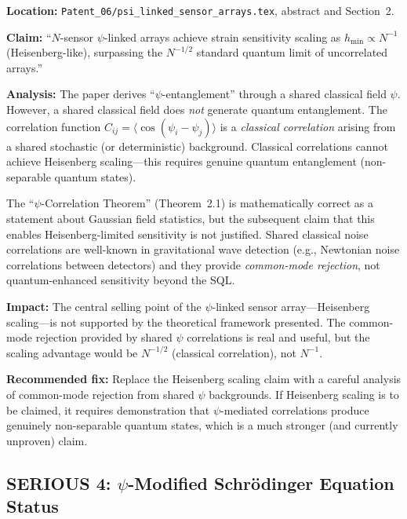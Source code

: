 \documentclass[12pt,a4paper]{article}
\begin{document}
\begin{serious}
\textbf{Location:} \texttt{Patent\_06/psi\_linked\_sensor\_arrays.tex},
abstract and Section~2.

\medskip
\textbf{Claim:} ``$N$-sensor $\psi$-linked arrays achieve strain sensitivity
scaling as $h_{\min} \propto N^{-1}$ (Heisenberg-like), surpassing the
$N^{-1/2}$ standard quantum limit of uncorrelated arrays.''

\medskip
\textbf{Analysis:} The paper derives ``$\psi$-entanglement'' through a
shared classical field $\psi$. However, a shared classical field does
\textit{not} generate quantum entanglement. The correlation function
$C_{ij} = \langle\cos(\psi_i - \psi_j)\rangle$ is a \textit{classical
correlation} arising from a shared stochastic (or deterministic) background.
Classical correlations cannot achieve Heisenberg scaling---this requires
genuine quantum entanglement (non-separable quantum states).

The ``$\psi$-Correlation Theorem'' (Theorem~2.1) is mathematically
correct as a statement about Gaussian field statistics, but the subsequent
claim that this enables Heisenberg-limited sensitivity is not justified.
Shared classical noise correlations are well-known in gravitational wave
detection (e.g., Newtonian noise correlations between detectors) and they
provide \textit{common-mode rejection}, not quantum-enhanced sensitivity
beyond the SQL.

\medskip
\textbf{Impact:} The central selling point of the $\psi$-linked sensor
array---Heisenberg scaling---is not supported by the theoretical framework
presented. The common-mode rejection provided by shared $\psi$ correlations
is real and useful, but the scaling advantage would be $N^{-1/2}$
(classical correlation), not $N^{-1}$.

\medskip
\textbf{Recommended fix:} Replace the Heisenberg scaling claim with a
careful analysis of common-mode rejection from shared $\psi$ backgrounds.
If Heisenberg scaling is to be claimed, it requires demonstration that
$\psi$-mediated correlations produce genuinely non-separable quantum states,
which is a much stronger (and currently unproven) claim.
\end{serious}

\subsection{SERIOUS 4: $\psi$-Modified Schr\"{o}dinger Equation Status}
\label{sec:ser4}
\end{document}
